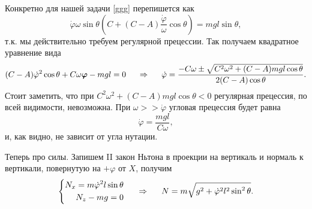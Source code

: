  Конкретно для нашей задачи \eqref{ggg} перепишется как
 \begin{equation*}
     \dot{\varphi} \omega \sin \theta 
     \left(
        C + (C-A) \frac{\dot{\varphi}}{\omega} \cos \theta
     \right) = mgl \sin \theta,
 \end{equation*}
 т.к. мы действительно требуем регулярной прецессии. Так получаем квадратное уравнение вида
 \begin{equation}
     (C-A) \dot{\varphi}^2 \cos \theta + C \omega \mbox{\boldmath $\varphi$} - mgl = 0
     \hspace{0.5cm} \Rightarrow \hspace{0.5cm} 
     \dot{\varphi} = 
     \frac{
        - C \omega \pm \sqrt{
            C^2 \omega^2 + (C-A) mgl \cos \theta
        }
     }{
        2(C-A) \cos \theta
     }  .
 \end{equation}
Стоит заметить, что при $C^2 \omega^2 + (C-A) mgl \cos \theta < 0$ регулярная прецессия, по всей видимости, невозможна. При $\omega >> \dot{\varphi}$ угловая прецессия будет равна
\begin{equation}
    \dot{\varphi} = \frac{mgl}{C\omega},
\end{equation}
и, как видно, не зависит от угла нутации. 

Теперь про силы. Запишем II закон Ньтона в проекции на вертикаль и нормаль к вертикали, повернутую на $+\varphi$ от $X$, получим
\begin{equation}
    \left\{\begin{aligned}
        N_x = m \dot{\varphi}^2 l \sin \theta \\
        N_z - mg = 0        
    \end{aligned}\right.
    \hspace{0.5cm} \Rightarrow \hspace{0.5cm} 
    N = m\sqrt{g^2 + \dot{\varphi}^2 l^2 \sin^2 \theta}.
\end{equation}